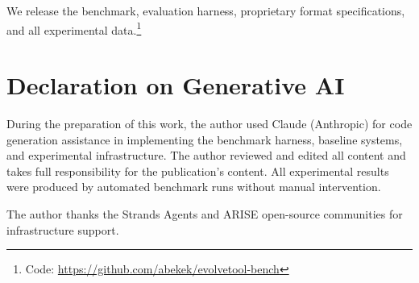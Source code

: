 \documentclass[]{ceurart}
\begin{document}
We release the benchmark, evaluation harness, proprietary format specifications, and all experimental data.\footnote{Code: \url{https://github.com/abekek/evolvetool-bench}}

\section*{Declaration on Generative AI}
During the preparation of this work, the author used Claude (Anthropic) for code generation assistance in implementing the benchmark harness, baseline systems, and experimental infrastructure. The author reviewed and edited all content and takes full responsibility for the publication's content. All experimental results were produced by automated benchmark runs without manual intervention.

\begin{acknowledgments}
The author thanks the Strands Agents and ARISE open-source communities for infrastructure support.
\end{acknowledgments}


\end{document}
